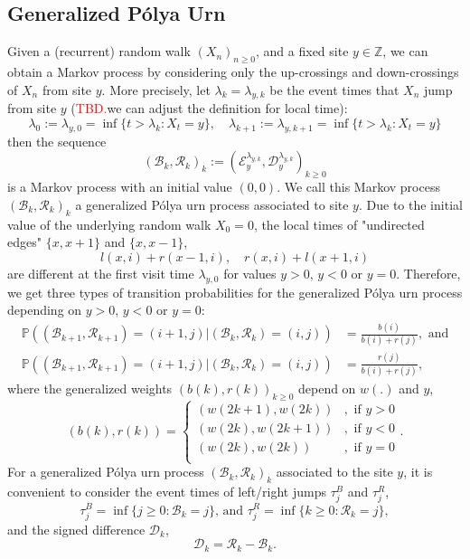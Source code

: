 \documentclass[twoside,12pt,a4paper]{article}
\numberwithin{equation}{section}
\newcommand\TBD{\textcolor{red}{TBD.}}
\begin{document}
	\subsection{Generalized P\'{o}lya  Urn}
	Given a (recurrent) random walk $(X_n)_{n\geq 0}$, and a fixed site $y\in \mathbb{Z}$, we can obtain a Markov process by considering only the up-crossings and down-crossings of $X_n$ from site $y$. More precisely, let $\lambda_k = \lambda_{y,k}$ be the event times that $X_n$ jump from site $y$ (\TBD{we can adjust the definition for local time}):
	$$
	\lambda_0 :=  \lambda_{y,0} =\inf\{ t> \lambda_{k}: X_t = y \} , \quad \lambda_{k+1} := \lambda_{y,k+1} = \inf\{ t> \lambda_{k}: X_t = y \}
	$$
	then the sequence 
	$$
	(\mathcal{B}_k,\mathcal{R}_k )_k:=\left(\mathcal{E}^{\lambda_{y,k}}_y, \mathcal{D}^{\lambda_{y,k}}_y\right)_{k\geq 0}  
	$$ is a Markov process with an initial value $(0,0)$. We call this Markov process $(\mathcal{B}_k,\mathcal{R}_k )_k$ a generalized P\'{o}lya urn process associated to site $y$. Due to the initial value of the underlying random walk $X_0=0$, the local times of "undirected edges" $\{x,x+1\}$ and $\{x,x-1\}$, 
	$$l(x,i)+r(x-1,i), \quad  r(x,i)+l(x+1,i)  $$ are different at the first visit time $\lambda_{y,0}$ for values $y>0$, $y<0$ or $y=0$. Therefore, we get three types of transition probabilities
	for the generalized P\'{o}lya urn process depending on $y>0$, $y<0$ or $y=0$:
	\begin{align*}\label{eq: transition prob for GPU}
		\mathbb{P} \left((\mathcal{B}_{k+1},\mathcal{R}_{k+1})=  (i+1,j) \vert (\mathcal{B}_{k},\mathcal{R}_{k}) =(i,j)  \right) &= \frac{b(i)}{b(i)+r(j)}, \mbox{ and}  \\
		\mathbb{P} \left((\mathcal{B}_{k+1},\mathcal{R}_{k+1})=  (i+1,j) \vert (\mathcal{B}_{k},\mathcal{R}_{k}) =(i,j)  \right) &= \frac{r(j)}{b(i)+r(j)},
	\end{align*} where the generalized weights $(b(k),r(k))_{k\geq 0}$ depend on $w(.)$ and $y$,  
	\begin{equation}\label{eq: generalized weights}
		(b(k), r(k)) = \begin{cases}
			(w(2k+1), w(2k)) &,  \text{ if }  y>0 \\
			(w(2k), w(2k+1)) &,  \text{ if }  y<0 \\  
			(w(2k), w(2k)) &,  \text{ if }  y=0 \\ 
		\end{cases}.
	\end{equation}
	For a generalized P\'{o}lya urn process $(\mathcal{B}_k,\mathcal{R}_k )_k$ associated to the site $y$, it is convenient to consider the event times of left/right jumps $\tau^B_j$ and $ \tau^R_j $,	
	$$ \tau^B_j = \inf\{ j\geq 0: \mathcal{B}_{k} =j   \}  \mbox{, and } \tau^R_j = \inf\{ k\geq 0: \mathcal{R}_{k} =j   \},
	$$ and the signed difference $\mathcal{D}_{k} $,
	\begin{equation}\label{eq:signed difference}
		\mathcal{D}_k  =\mathcal{R}_k -\mathcal{B}_k.  
	\end{equation} 
	
\end{document}
